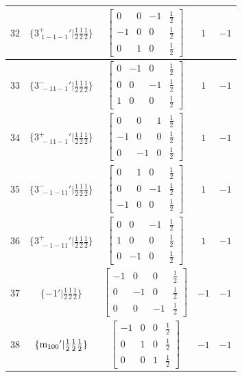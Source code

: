 \documentclass[fleqn,8pt]{jsarticle}
\begin{document}
\begin{longtable}{ccccc}
$ 32 $ & $ \{3^{+}_{\,\,1-1-1}{}'|\frac{1}{2} \frac{1}{2} \frac{1}{2}\} $ & $ \begin{bmatrix} 0 & 0 & -1 & \frac{1}{2} \\ -1 & 0 & 0 & \frac{1}{2} \\ 0 & 1 & 0 & \frac{1}{2} \end{bmatrix} $ & $ 1 $ & $ -1 $ \\ \hline
$ 33 $ & $ \{3^{-}_{\,\,-11-1}{}'|\frac{1}{2} \frac{1}{2} \frac{1}{2}\} $ & $ \begin{bmatrix} 0 & -1 & 0 & \frac{1}{2} \\ 0 & 0 & -1 & \frac{1}{2} \\ 1 & 0 & 0 & \frac{1}{2} \end{bmatrix} $ & $ 1 $ & $ -1 $ \\ \hline
$ 34 $ & $ \{3^{+}_{\,\,-11-1}{}'|\frac{1}{2} \frac{1}{2} \frac{1}{2}\} $ & $ \begin{bmatrix} 0 & 0 & 1 & \frac{1}{2} \\ -1 & 0 & 0 & \frac{1}{2} \\ 0 & -1 & 0 & \frac{1}{2} \end{bmatrix} $ & $ 1 $ & $ -1 $ \\ \hline
$ 35 $ & $ \{3^{-}_{\,\,-1-11}{}'|\frac{1}{2} \frac{1}{2} \frac{1}{2}\} $ & $ \begin{bmatrix} 0 & 1 & 0 & \frac{1}{2} \\ 0 & 0 & -1 & \frac{1}{2} \\ -1 & 0 & 0 & \frac{1}{2} \end{bmatrix} $ & $ 1 $ & $ -1 $ \\ \hline
$ 36 $ & $ \{3^{+}_{\,\,-1-11}{}'|\frac{1}{2} \frac{1}{2} \frac{1}{2}\} $ & $ \begin{bmatrix} 0 & 0 & -1 & \frac{1}{2} \\ 1 & 0 & 0 & \frac{1}{2} \\ 0 & -1 & 0 & \frac{1}{2} \end{bmatrix} $ & $ 1 $ & $ -1 $ \\ \hline
$ 37 $ & $ \{-1{}'|\frac{1}{2} \frac{1}{2} \frac{1}{2}\} $ & $ \begin{bmatrix} -1 & 0 & 0 & \frac{1}{2} \\ 0 & -1 & 0 & \frac{1}{2} \\ 0 & 0 & -1 & \frac{1}{2} \end{bmatrix} $ & $ -1 $ & $ -1 $ \\ \hline
$ 38 $ & $ \{{\rm m}_{100}{}'|\frac{1}{2} \frac{1}{2} \frac{1}{2}\} $ & $ \begin{bmatrix} -1 & 0 & 0 & \frac{1}{2} \\ 0 & 1 & 0 & \frac{1}{2} \\ 0 & 0 & 1 & \frac{1}{2} \end{bmatrix} $ & $ -1 $ & $ -1 $ \\ \hline

\end{longtable}
\end{document}

